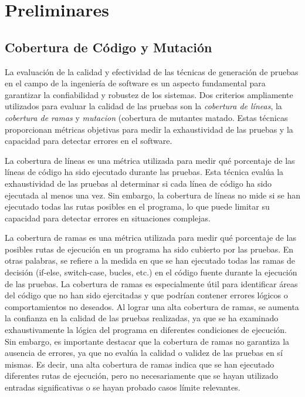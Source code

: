\chapter[Preliminares]{Preliminares}
\label{cap:preliminares.BE}


\section{Cobertura de Código y Mutación}
\label{sec:coverage}
La evaluación de la calidad y efectividad de las técnicas de generación de pruebas en el campo de la ingeniería de software es un aspecto fundamental para garantizar la confiabilidad y robustez de los sistemas. Dos criterios ampliamente utilizados para evaluar la calidad de las pruebas son la \emph{cobertura de líneas}, la \emph{cobertura de ramas} y \emph{mutacion} (cobertura de mutantes matado. Estas técnicas proporcionan métricas objetivas para medir la exhaustividad de las pruebas y la capacidad para detectar errores en el software.

La cobertura de líneas es una métrica utilizada para medir qué porcentaje de las líneas de código ha sido ejecutado durante las pruebas. 
Esta técnica evalúa la exhaustividad de las pruebas al determinar si cada línea de código ha sido ejecutada al menos una vez. 
Sin embargo, la cobertura de líneas no mide si se han ejecutado todas las rutas posibles en el programa, lo que puede limitar su capacidad para detectar errores en situaciones complejas.

La cobertura de ramas es una métrica utilizada para medir qué porcentaje de las posibles rutas de ejecución en un programa ha sido cubierto por las pruebas. En otras palabras, se refiere a la medida en que se han ejecutado todas las ramas de decisión (if-else, switch-case, bucles, etc.) en el código fuente durante la ejecución de las pruebas. La cobertura de ramas es especialmente útil para identificar áreas del código que no han sido ejercitadas y que podrían contener errores lógicos o comportamientos no deseados.
Al lograr una alta cobertura de ramas, se aumenta la confianza en la calidad de las pruebas realizadas, ya que se ha examinado exhaustivamente la lógica del programa en diferentes condiciones de ejecución. Sin embargo, es importante destacar que la cobertura de ramas no garantiza la ausencia de errores, ya que no evalúa la calidad o validez de las pruebas en sí mismas. Es decir, una alta cobertura de ramas indica que se han ejecutado diferentes rutas de ejecución, pero no necesariamente que se hayan utilizado entradas significativas o se hayan probado casos límite relevantes.

